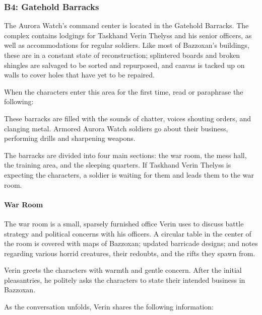 \documentclass[10pt,a4paper,twoside,twocolumn,openany,nodeprecatedcode]{dndbook}
\begin{document}
\subsubsection{B4: Gatehold Barracks}
The Aurora Watch's command center is located in the Gatehold Barracks. The complex contains lodgings for Taskhand Verin Thelyss and his senior officers, as well as accommodations for regular soldiers. Like most of Bazzoxan's buildings, these are in a constant state of reconstruction; splintered boards and broken shingles are salvaged to be sorted and repurposed, and canvas is tacked up on walls to cover holes that have yet to be repaired.

When the characters enter this area for the first time, read or paraphrase the following:

\begin{DndReadAloud}{}
These barracks are filled with the sounds of chatter, voices shouting orders, and clanging metal. Armored Aurora Watch soldiers go about their business, performing drills and sharpening weapons.

\end{DndReadAloud}

The barracks are divided into four main sections: the war room, the mess hall, the training area, and the sleeping quarters. If Taskhand Verin Thelyss is expecting the characters, a soldier is waiting for them and leads them to the war room.

\paragraph{War Room}
The war room is a small, sparsely furnished office Verin uses to discuss battle strategy and political concerns with his officers. A circular table in the center of the room is covered with maps of Bazzoxan; updated barricade designs; and notes regarding various horrid creatures, their redoubts, and the rifts they spawn from.

Verin greets the characters with warmth and gentle concern. After the initial pleasantries, he politely asks the characters to state their intended business in Bazzoxan.

As the conversation unfolds, Verin shares the following information:
\end{document}
